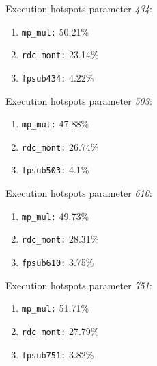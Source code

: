Execution hotspots parameter \textit{434}:
\begin{enumerate}[noitemsep]
	\item \texttt{mp\_mul:} 50.21\%
	\item \texttt{rdc\_mont:} 23.14\%
	\item \texttt{fpsub434:} 4.22\%
\end{enumerate}
Execution hotspots parameter \textit{503}:
\begin{enumerate}[noitemsep]
	\item \texttt{mp\_mul:} 47.88\%
	\item \texttt{rdc\_mont:} 26.74\%
	\item \texttt{fpsub503:} 4.1\%
\end{enumerate}
Execution hotspots parameter \textit{610}:
\begin{enumerate}[noitemsep]
	\item \texttt{mp\_mul:} 49.73\%
	\item \texttt{rdc\_mont:} 28.31\%
	\item \texttt{fpsub610:} 3.75\%
\end{enumerate}
Execution hotspots parameter \textit{751}:
\begin{enumerate}[noitemsep]
	\item \texttt{mp\_mul:} 51.71\%
	\item \texttt{rdc\_mont:} 27.79\%
	\item \texttt{fpsub751:} 3.82\%
\end{enumerate}
